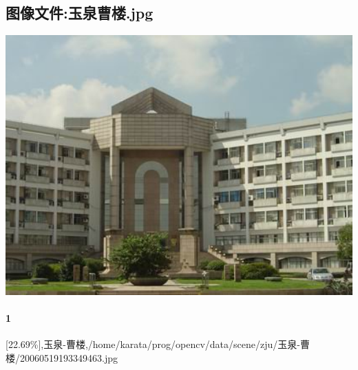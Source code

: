\subsection{图像文件:玉泉曹楼.jpg}
\includegraphics[width=15cm,angle=0]{玉泉曹楼.jpg}

\paragraph{1}
[22.69\%],玉泉-曹楼,/home/karata/prog/opencv/data/scene/zju/玉泉-曹楼/20060519193349463.jpg

